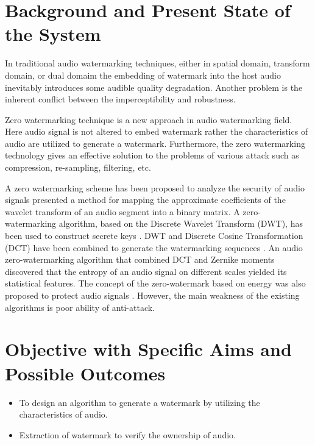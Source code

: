 \documentclass[12pt,a4paper]{article}
\begin{document}
\section{Background and Present State of the System}

In traditional audio watermarking techniques, either in
spatial domain, transform domain, or dual domaim \cite{wang, wqi} the embedding of watermark into the host audio inevitably introduces some audible quality degradation. Another problem is the inherent conflict between the imperceptibility and robustness.

\bigskip

Zero watermarking technique is a new approach in audio watermarking field. Here audio signal is not altered to embed watermark rather the characteristics of audio are utilized to generate a watermark. Furthermore, the
zero watermarking technology gives an effective solution to the problems of various attack such as compression, re-sampling, filtering, etc.

\bigskip

A zero watermarking scheme has been proposed to analyze the security of audio signals \cite{zws} presented a method for mapping the approximate coefficients of the wavelet transform of an audio segment into a binary matrix. A zero-watermarking algorithm, based on the Discrete Wavelet Transform (DWT), has been used to construct secrete keys \cite{dwt}. DWT and Discrete Cosine Transformation (DCT) have been combined to generate the watermarking sequences \cite{ieee, eurasip}. An audio zero-watermarking algorithm that combined DCT and Zernike moments \cite{zernik} discovered that the entropy of an audio signal on different scales yielded its statistical features. The concept of the zero-watermark based on energy was also proposed to protect audio signals \cite{energy}. However, the main weakness of the existing algorithms is poor ability of anti-attack.

\section{Objective with Specific Aims and Possible Outcomes}


\begin{itemize}

\item 
To design an algorithm to generate a watermark by utilizing the characteristics of audio.

\item
Extraction of watermark to verify the ownership of audio.

\end{itemize}
\end{document}
